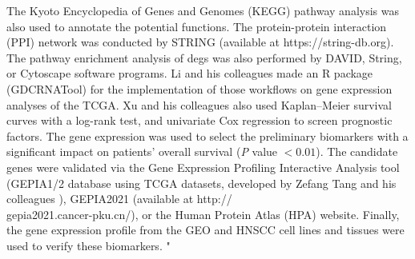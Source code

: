 \documentclass[preprint,12pt]{elsarticle}
\newenvironment{MyIndent}
{\par\leftskip1cm\relax\rightskip1cm\relax}
{\par\leftskip0cm\relax\rightskip0cm\relax}
\newenvironment{MyColorPar}[1]{%
    \leavevmode\color{#1}\ignorespaces%
}{%
}%
\begin{document}
\begin{MyColorPar}{blue}
\begin{MyIndent}
\begin{MyColorPar}{red}
The Kyoto Encyclopedia of Genes and Genomes (KEGG) pathway analysis was also used to annotate the potential functions.
The protein-protein interaction (PPI) network was conducted by STRING (available at https://string-db.org).
The pathway enrichment analysis of \acrshort{degs} was also performed by DAVID, String, or Cytoscape software programs\cite{Huang2019}\cite{Shen2019}.
Li\cite{Li2018a} and his colleagues made an R package (GDCRNATool) for the implementation of those workflows on gene expression analyses of the TCGA.
Xu and his colleagues\cite{Xu2021a} also used Kaplan–Meier survival curves with a log-rank test, and univariate Cox regression to screen prognostic factors.
The gene expression was used to select the preliminary biomarkers with a significant impact on patients' overall survival (\textit{P} value $< 0.01$).
The candidate genes were validated via the Gene Expression Profiling Interactive Analysis tool (GEPIA1/2 database using TCGA datasets, developed by Zefang Tang and his colleagues\cite{Tang2017a}\cite{Tang2019}
), GEPIA2021\cite{Li2021} (available at http://\\gepia2021.cancer-pku.cn/), or the Human Protein Atlas (HPA) website.
Finally, the gene expression profile from the GEO and HNSCC cell lines and tissues were used to verify these biomarkers.
"


\end{MyColorPar}
\end{MyIndent}
\end{MyColorPar}
\end{document}
